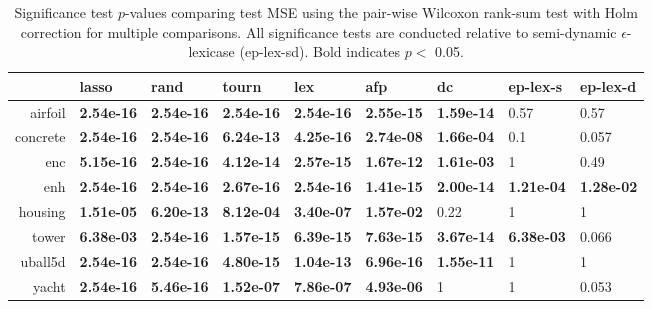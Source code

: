 \begin{table}[ht]
\centering
\caption{Significance test $p$-values comparing test MSE using the pair-wise Wilcoxon rank-sum test with Holm correction for multiple comparisons. All significance tests are conducted relative to semi-dynamic $\epsilon$-lexicase (ep-lex-sd). Bold indicates $p<$ 0.05.} 
\label{tbl:wilcox}
\begingroup\footnotesize
\begin{tabular}{rllllllll}
  \toprule
 & lasso & rand & tourn & lex & afp & dc & ep-lex-s & ep-lex-d \\ 
  \midrule
airfoil & {\bf 2.54e-16} & {\bf 2.54e-16} & {\bf 2.54e-16} & {\bf 2.54e-16} & {\bf 2.55e-15} & {\bf 1.59e-14} & 0.57 & 0.57 \\ 
  concrete & {\bf 2.54e-16} & {\bf 2.54e-16} & {\bf 6.24e-13} & {\bf 4.25e-16} & {\bf 2.74e-08} & {\bf 1.66e-04} & 0.1 & 0.057 \\ 
  enc & {\bf 5.15e-16} & {\bf 2.54e-16} & {\bf 4.12e-14} & {\bf 2.57e-15} & {\bf 1.67e-12} & {\bf 1.61e-03} &   1 & 0.49 \\ 
  enh & {\bf 2.54e-16} & {\bf 2.54e-16} & {\bf 2.67e-16} & {\bf 2.54e-16} & {\bf 1.41e-15} & {\bf 2.00e-14} & {\bf 1.21e-04} & {\bf 1.28e-02} \\ 
  housing & {\bf 1.51e-05} & {\bf 6.20e-13} & {\bf 8.12e-04} & {\bf 3.40e-07} & {\bf 1.57e-02} & 0.22 &   1 &   1 \\ 
  tower & {\bf 6.38e-03} & {\bf 2.54e-16} & {\bf 1.57e-15} & {\bf 6.39e-15} & {\bf 7.63e-15} & {\bf 3.67e-14} & {\bf 6.38e-03} & 0.066 \\ 
  uball5d & {\bf 2.54e-16} & {\bf 2.54e-16} & {\bf 4.80e-15} & {\bf 1.04e-13} & {\bf 6.96e-16} & {\bf 1.55e-11} &   1 &   1 \\ 
  yacht & {\bf 2.54e-16} & {\bf 5.46e-16} & {\bf 1.52e-07} & {\bf 7.86e-07} & {\bf 4.93e-06} &   1 &   1 & 0.053 \\ 
   \bottomrule
\end{tabular}
\endgroup
\end{table}
